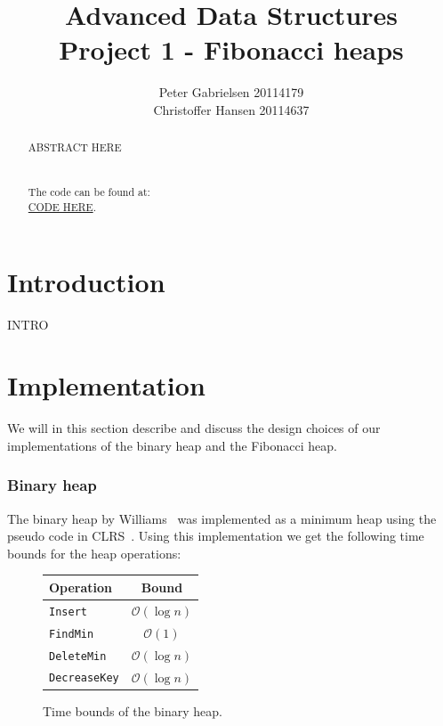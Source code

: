 \documentclass[a4paper,oneside,article,11pt]{memoir}
\title{Advanced Data Structures \\ Project 1 - Fibonacci heaps}
\author{Peter Gabrielsen 20114179 \\
Christoffer Hansen 20114637}
\begin{document}
\begin{titlingpage}
\clearpage

\maketitle
\thispagestyle{empty}

\begin{abstract}
ABSTRACT HERE
\\
\\
\\
The code can be found at: \\\url{CODE HERE}.
\end{abstract}
\end{titlingpage}

\pagebreak

\tableofcontents

\pagebreak

\chapter{Introduction}
INTRO

\chapter{Implementation}
We will in this section describe and discuss the design choices of our implementations of the binary heap and the Fibonacci heap.
\subsection{Binary heap}
The binary heap by Williams~\cite{williams} was implemented as a minimum heap using the pseudo code in CLRS~\cite[p.~151-170]{clrs}. Using this implementation we get the following time bounds for the heap operations:

\begin{figure}[H]
\centering
\begin{tabular}{l|c}
Operation & Bound \\\hline
\texttt{Insert} & $\mathcal{O}(\log n)$ \\\hline
\texttt{FindMin} & $\mathcal{O}(1)$ \\\hline
\texttt{DeleteMin} & $\mathcal{O}(\log n)$ \\\hline
\texttt{DecreaseKey} & $\mathcal{O}(\log n)$
\end{tabular}
\caption{Time bounds of the binary heap.}
\end{figure}
\end{document}
